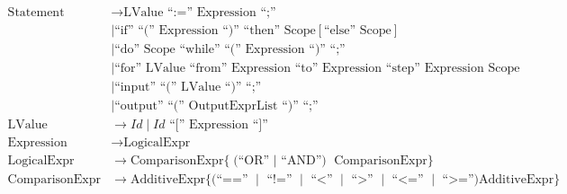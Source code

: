 \documentclass[12pt,a4paper]{article}
\begin{document}
\[\begin{array}{rl}
		\text{Statement}                & \rightarrow \text{LValue} \text{ ``:='' } \text{Expression} \text{ ``;''}                                                                                                   \\
		                                & \mid \text{``if'' ``('' } \text{Expression} \text{ ``)'' ``then'' } \text{Scope} [\text{``else'' } \text{Scope}]                                                            \\
		                                & \mid \text{``do'' } \text{Scope} \text{ ``while'' ``('' } \text{Expression} \text{ ``)'' ``;''}                                                                             \\
		                                & \mid \text{``for'' } \text{LValue} \text{ ``from'' } \text{Expression} \text{ ``to'' } \text{Expression} \text{ ``step'' } \text{Expression} \text{ Scope}                  \\
		                                & \mid \text{``input'' ``('' } \text{LValue} \text{ ``)'' ``;''}                                                                                                              \\
		                                & \mid \text{``output'' ``('' } \text{OutputExprList} \text{ ``)'' ``;''}                                                                                                     \\

		\text{LValue}                   & \rightarrow \mathit{Id} \mid \mathit{Id} \text{ ``['' } \text{Expression} \text{ ``]''}                                                                                     \\

		\text{Expression}               & \rightarrow \text{LogicalExpr}                                                                                                                                              \\

		\text{LogicalExpr}              & \rightarrow \text{ComparisonExpr} \{ \text{(``OR'' $\mid$ ``AND'') } \text{ComparisonExpr} \}                                                                               \\

		\text{ComparisonExpr}           & \rightarrow \text{AdditiveExpr} \{ \text{(``=='' $\mid$ ``!='' $\mid$ ``<'' $\mid$ ``>'' $\mid$ ``<='' $\mid$ ``>='')} \text{AdditiveExpr} \}                               \\


\end{array}\]
\end{document}
